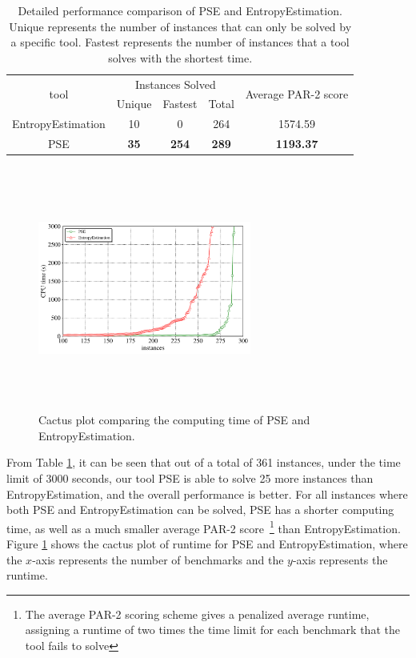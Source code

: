 \begin{table}[h!]
	\centering
	\begin{tabular}{ ccccc } 
		\toprule 
		\multirow{2}{*}{tool}  & \multicolumn{3}{c}{Instances Solved} & \multirow{2}{*}{Average PAR-2 score} \\
		 \cline{2-4}
		& Unique & Fastest & Total \\ 
		\midrule 
		EntropyEstimation & 10 & 0 & 264 & 1574.59 \\ 
		
		PSE & \textbf{35} & \textbf{254} & \textbf{289} & \textbf{1193.37} \\
		\bottomrule
	\end{tabular}
	\caption{Detailed performance comparison of PSE and EntropyEstimation. Unique represents the number of instances that can only be solved by a specific tool. Fastest represents the number of instances that a tool solves with the shortest time.}
	\label{table:2}
\end{table}

\begin{figure}[htbp]
	\centering
	\includegraphics[width=7cm,height=8cm]{figures/PSEvsEntropyEstimation.pdf}
	\caption{Cactus plot comparing the computing time of PSE and EntropyEstimation.
	}
	\label{figure:2}
\end{figure} 

From Table \ref{table:2}, it can be seen that out of a total of 361 instances, under the time limit of 3000 seconds, our tool PSE is able to solve 25 more instances than EntropyEstimation, and the overall performance is better. 
For all instances where both PSE and EntropyEstimation can be solved, PSE has a shorter computing time, as well as a much smaller average PAR-2 score~\footnote{The average PAR-2 scoring scheme gives a penalized average runtime, assigning a runtime of two times the time limit for each benchmark that the tool fails to solve} than EntropyEstimation.
Figure \ref{figure:2} shows the cactus plot of runtime for PSE and EntropyEstimation, where the $x$-axis represents the number of benchmarks and the $y$-axis represents the runtime.

